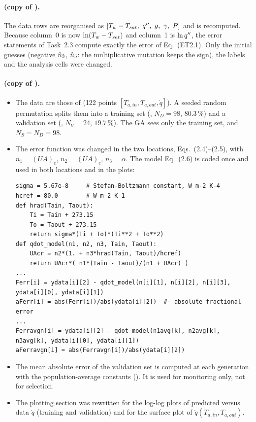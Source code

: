\paragraph{ (copy of ).} The data rows are reorganised as
$[T_w-T_{sat},\ q'',\ g,\ \gamma,\ P]$ and  is recomputed. Because column~0 is now
$\ln(T_w-T_{sat})$ and column~1 is $\ln q''$, the error statements of Task~2.3 compute exactly the error of
Eq.~(ET2.1). Only the initial guesses (negative $\hat{n}_{3}$, $\hat{n}_{5}$: the multiplicative mutation keeps the
sign), the labels and the analysis cells were changed.

\paragraph{ (copy of ).}
\begin{itemize}
  \item The data are those of  (122 points $[T_{a,in},T_{a,out},\dot q]$). A seeded random
        permutation splits them into a training set (, $N_D=98$, $80.3\,\%$) and a validation set
        (, $N_V=24$, $19.7\,\%$). The GA sees only the training set, and $N_S=N_D=98$.
  \item The error function was changed in the two locations, Eqs.~(2.4)--(2.5), with $n_1=(UA)_e$,
        $n_2=(UA)_c$, $n_3=\alpha$. The model Eq.~(2.6) is coded once and used in both locations and in the plots:
\begin{lstlisting}
sigma = 5.67e-8     # Stefan-Boltzmann constant, W m-2 K-4
hcref = 80.0        # W m-2 K-1
def hrad(Tain, Taout):
    Ti = Tain + 273.15
    To = Taout + 273.15
    return sigma*(Ti + To)*(Ti**2 + To**2)
def qdot_model(n1, n2, n3, Tain, Taout):
    UAcr = n2*(1. + n3*hrad(Tain, Taout)/hcref)
    return UAcr*( n1*(Tain - Taout)/(n1 + UAcr) )
...
Ferr[i] = ydata[i][2] - qdot_model(n[i][1], n[i][2], n[i][3], ydata[i][0], ydata[i][1])
aFerr[i] = abs(Ferr[i])/abs(ydata[i][2])  #- absolute fractional error
...
Ferravgn[i] = ydata[i][2] - qdot_model(n1avg[k], n2avg[k], n3avg[k], ydata[i][0], ydata[i][1])
aFerravgn[i] = abs(Ferravgn[i])/abs(ydata[i][2])
\end{lstlisting}
  \item The mean absolute error of the validation set is computed at each generation with the
        population-average constants (). It is used for monitoring only, not for selection.
  \item The plotting section was rewritten for the log-log plots of predicted versus data $\dot q$ (training
        and validation) and for the surface plot of $\dot q(T_{a,in},T_{a,out})$.
\end{itemize}
